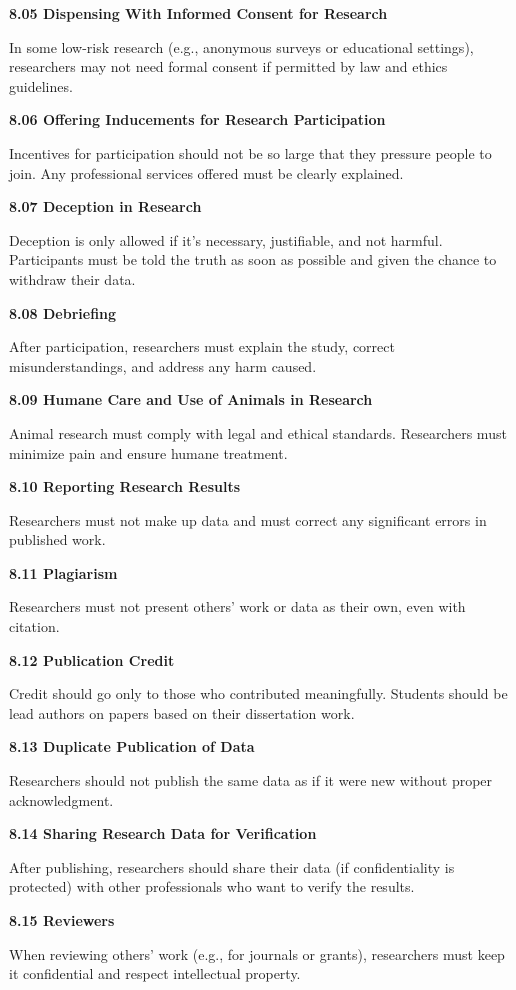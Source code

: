 \documentclass[
]{krantz}
\begin{document}
\textbf{8.05 Dispensing With Informed Consent for Research}

In some low-risk research (e.g., anonymous surveys or educational settings), researchers may not need formal consent if permitted by law and ethics guidelines.

\textbf{8.06 Offering Inducements for Research Participation}

Incentives for participation should not be so large that they pressure people to join. Any professional services offered must be clearly explained.

\textbf{8.07 Deception in Research}

Deception is only allowed if it's necessary, justifiable, and not harmful. Participants must be told the truth as soon as possible and given the chance to withdraw their data.

\textbf{8.08 Debriefing}

After participation, researchers must explain the study, correct misunderstandings, and address any harm caused.

\textbf{8.09 Humane Care and Use of Animals in Research}

Animal research must comply with legal and ethical standards. Researchers must minimize pain and ensure humane treatment.

\textbf{8.10 Reporting Research Results}

Researchers must not make up data and must correct any significant errors in published work.

\textbf{8.11 Plagiarism}

Researchers must not present others' work or data as their own, even with citation.

\textbf{8.12 Publication Credit}

Credit should go only to those who contributed meaningfully. Students should be lead authors on papers based on their dissertation work.

\textbf{8.13 Duplicate Publication of Data}

Researchers should not publish the same data as if it were new without proper acknowledgment.

\textbf{8.14 Sharing Research Data for Verification}

After publishing, researchers should share their data (if confidentiality is protected) with other professionals who want to verify the results.

\textbf{8.15 Reviewers}

When reviewing others' work (e.g., for journals or grants), researchers must keep it confidential and respect intellectual property.
\end{document}
